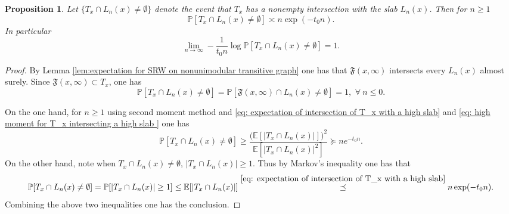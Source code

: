 \documentclass[12pt]{article}
\newtheorem{proposition}[theorem]{Proposition}
\numberwithin{equation}{section}
\newcommand{\be}{\begin{equation}}
\newcommand{\ee}{\end{equation}}
\newcommand{\1}{\mathbf{1}}
\begin{document}
 \begin{proposition}\label{prop: exponential decay of the probability that T_x intersecting a high slab}
 	Let $\{T_x\cap L_n(x)\neq \emptyset\}$ denote the event that $T_x$ has a nonempty intersection with the slab $L_n(x)$. Then for $n\geq1$
 	\be\label{eq: exponential decay for T_x intersecting a high slab}
  \mathbb{P}[T_x\cap L_n(x)\neq \emptyset]\asymp n\exp(-t_0n).
 	\ee
 	In particular
 	\be
 	\lim_{n\rightarrow\infty}-\frac{1}{t_0n}\log\mathbb{P}[T_x\cap L_n(x)\neq \emptyset]=1.
 	\ee
 	
 \end{proposition}
\begin{proof}
	By Lemma \ref{lem:expectation for SRW on nonunimodular transitive graph} one has that $\mathfrak{F}(x,\infty)$ intersects every $L_n(x)$ almost surely. Since $\mathfrak{F}(x,\infty)\subset T_x$, one has 
	\be\label{eq: almost surely nonempty intersection with lower slabs}
	\mathbb{P}[T_x\cap L_n(x)\neq\emptyset]=\mathbb{P}[\mathfrak{F}(x,\infty)\cap L_n(x)\neq\emptyset]=1,\,\,\forall \ n\leq 0.
	\ee

	
	On the one hand, for $n\geq1$ using second moment method and  \eqref{eq: expectation of intersection of T_x with a high slab} and \eqref{eq: high moment for T_x intersecting a high slab }  one has 
	\[
	\mathbb{P}[T_x\cap L_n(x)\neq \emptyset]
	\geq 
	\frac{\big(\mathbb{E}[|T_x\cap L_n(x)|]\big)^2}{\mathbb{E}[|T_x\cap L_n(x)|^2]}
	\succeq ne^{-t_0n}.
	\]
	On the other hand, note when $T_x\cap L_n(x)\neq \emptyset$, $|T_x\cap L_n(x)|\geq1$. Thus by Markov's inequality one has that 
	\[
		\mathbb{P}[T_x\cap L_n(x)\neq \emptyset]=\mathbb{P}[|T_x\cap L_n(x)|\geq 1]
		\leq \mathbb{E}[|T_x\cap L_{n}(x)|]\stackrel{\eqref{eq: expectation of intersection of T_x with a high slab}}{\preceq } n\exp(-t_0n).
	\]
	Combining the above two inequalities one has the conclusion. 
\end{proof}
\end{document}
